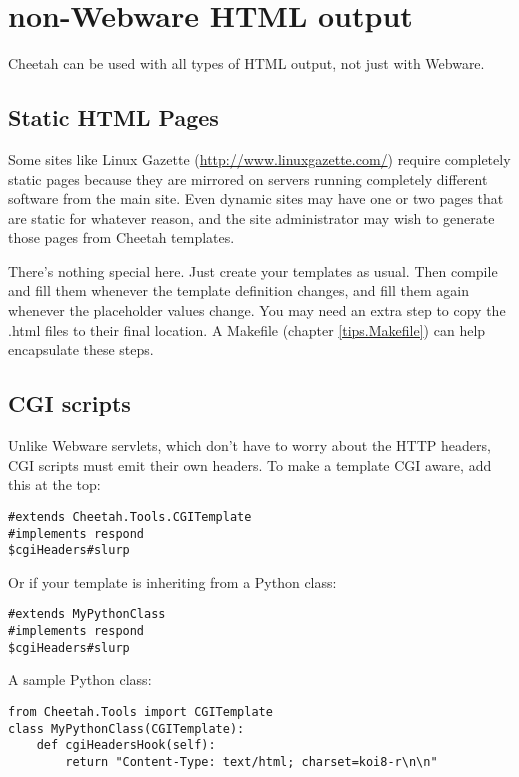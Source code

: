 \section{non-Webware HTML output}
\label{otherHTML}

Cheetah can be used with all types of HTML output, not just with Webware.


\subsection{Static HTML Pages}
\label{otherHTML.static}

Some sites like Linux Gazette (\url{http://www.linuxgazette.com/}) require
completely static pages because they are mirrored on servers running completely
different software from the main site.  Even dynamic sites may have one or
two pages that are static for whatever reason, and the site administrator may
wish to generate those pages from Cheetah templates.

There's nothing special here.  Just create your templates as usual.  Then
compile and fill them whenever the template definition changes, and fill them
again whenever the placeholder values change.  You may need an extra step to
copy the .html files to their final location.  A Makefile (chapter
\ref{tips.Makefile}) can help encapsulate these steps.


\subsection{CGI scripts}
\label{otherHTML}

Unlike Webware servlets, which don't have to worry about the HTTP headers,
CGI scripts must emit their own headers.  To make a template CGI aware, add
this at the top:
\begin{verbatim}
#extends Cheetah.Tools.CGITemplate
#implements respond
$cgiHeaders#slurp
\end{verbatim}

Or if your template is inheriting from a Python class:
\begin{verbatim}
#extends MyPythonClass
#implements respond
$cgiHeaders#slurp
\end{verbatim}

A sample Python class:
\begin{verbatim}
from Cheetah.Tools import CGITemplate
class MyPythonClass(CGITemplate):
    def cgiHeadersHook(self):
        return "Content-Type: text/html; charset=koi8-r\n\n"
\end{verbatim}


